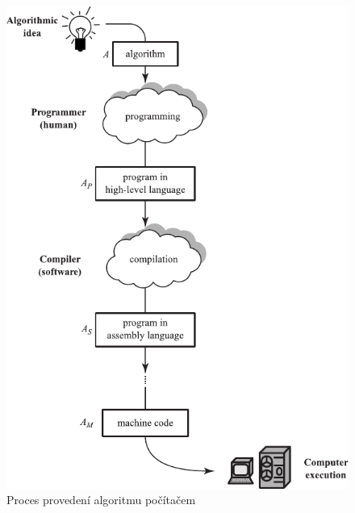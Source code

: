 \documentclass[FP,DP]{tulthesis}
\begin{document}
\begin{figure}
    \centering
    \includegraphics{programming.pdf}
\caption{Proces provedení algoritmu počítačem \citep[s.~56]{spirit}} \label{provedeni2}
\end{figure}

\end{document}
